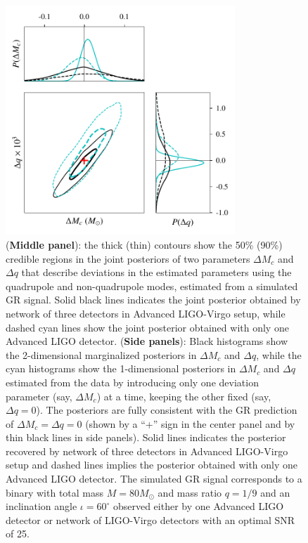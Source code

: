\documentclass[prd,preprintnumbers,twocolumn,eqsecnum,floatfix,a4paper,nofootinbib,superscriptaddress]{revtex4}
\begin{document}
\begin{figure}[htb] \begin{center}
		\includegraphics[width=3.4in]{figs/hm_mcq_1det_3det_compare_GR.pdf}
		\caption{(\textbf{Middle panel}): the thick (thin) contours show the 50\% (90\%) credible regions in the joint posteriors of two parameters $\Delta M_c$ and $\Delta q$ that describe deviations in the estimated parameters using the quadrupole and non-quadrupole modes, estimated from a simulated GR signal. Solid black lines indicates the joint posterior obtained by network of three detectors in Advanced LIGO-Virgo setup, while dashed cyan lines show the  joint posterior obtained with only one Advanced LIGO detector. (\textbf{Side panels}): Black histograms show the 2-dimensional marginalized posteriors in $\Delta M_c$ and $\Delta q$, while the cyan histograms show the 1-dimensional posteriors in $\Delta M_c$ and $\Delta q$ estimated from the data by introducing only one deviation parameter (say, $\Delta M_c$) at a time, keeping the other fixed (say, $\Delta q = 0$). The posteriors are fully consistent with the GR prediction of $\Delta M_c = \Delta q = 0$ (shown by a ``+'' sign in the center panel and by thin black lines in side panels).  Solid lines indicates the posterior recovered by network of three detectors in Advanced LIGO-Virgo setup and dashed lines implies the posterior obtained with only one Advanced LIGO detector. The simulated GR signal corresponds to a binary with total mass $M = {80}M_\odot$ and mass ratio $q = 1/9$ and an inclination angle $\iota = {60^\circ}$ observed either by one Advanced LIGO detector or network of LIGO-Virgo detectors with an optimal SNR of 25. }
		\label{fig:hm_mcq_compare-1det_3det_GR_inj}
	\end{center} \end{figure}
\end{document}
